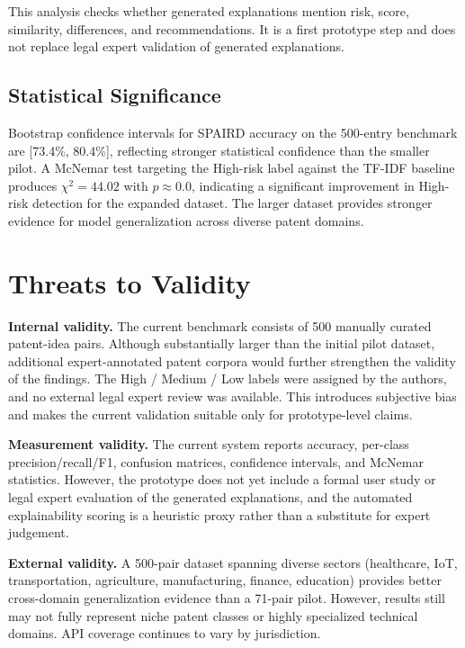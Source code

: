 \documentclass[conference]{IEEEtran}
\begin{document}
This analysis checks whether generated explanations mention risk, score,
similarity, differences, and recommendations. It is a first prototype step
and does not replace legal expert validation of generated explanations.

\subsection{Statistical Significance}

Bootstrap confidence intervals for SPAIRD accuracy on the 500-entry benchmark
are [73.4\%, 80.4\%], reflecting stronger statistical confidence than the smaller pilot.
A McNemar test targeting the High-risk label against the TF-IDF baseline
produces $\chi^2 = 44.02$ with $p \approx 0.0$, indicating a
significant improvement in High-risk detection for the expanded dataset.
The larger dataset provides stronger evidence for model generalization across diverse patent domains.

\section{Threats to Validity}

\textbf{Internal validity.}
The current benchmark consists of 500 manually curated patent-idea pairs. Although substantially larger than the initial pilot dataset, additional expert-annotated patent corpora would further strengthen the validity of the findings. The High / Medium / Low labels were assigned by the authors, and no external legal expert review was available. This introduces subjective bias and makes the current validation suitable only for prototype-level claims.

\textbf{Measurement validity.}
The current system reports accuracy, per-class precision/recall/F1, confusion matrices, confidence intervals, and McNemar statistics. However, the prototype does not yet include a formal user study or legal expert evaluation of the generated explanations, and the automated explainability scoring is a heuristic proxy rather than a substitute for expert judgement.

\textbf{External validity.}
A 500-pair dataset spanning diverse sectors (healthcare, IoT, transportation, agriculture, manufacturing, finance, education) provides better cross-domain generalization evidence than a 71-pair pilot.
However, results still may not fully represent niche patent classes or highly specialized technical domains.
API coverage continues to vary by jurisdiction.
\end{document}
